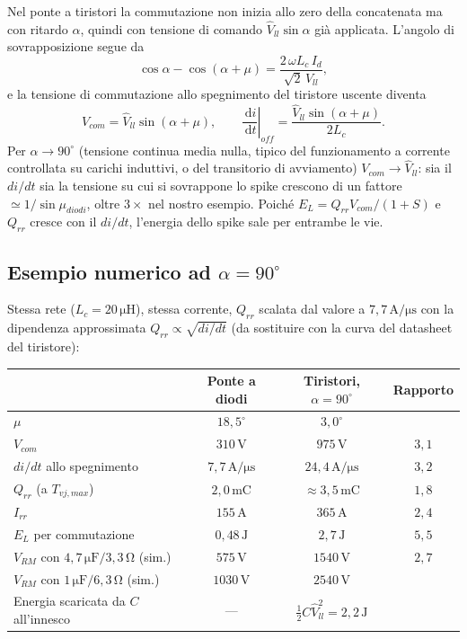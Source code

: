 \documentclass[11pt,a4paper]{article}
\newcommand{\ud}{\,\mathrm{d}}
\newcommand{\unit}[1]{\,\mathrm{#1}}
\begin{document}
Nel ponte a tiristori la commutazione non inizia allo zero della
concatenata ma con ritardo $\alpha$, quindi con tensione di comando
$\hat{V}_{ll}\sin\alpha$ gi\`a applicata. L'angolo di sovrapposizione
segue da
\begin{equation}
\cos\alpha - \cos(\alpha+\mu) = \frac{2\,\omega L_c\, I_d}{\sqrt{2}\,V_{ll}},
\end{equation}
e la tensione di commutazione allo spegnimento del tiristore uscente
diventa
\begin{equation}
V_{com} = \hat{V}_{ll}\sin(\alpha+\mu),
\qquad
\left.\frac{\ud i}{\ud t}\right|_{off} = \frac{\hat{V}_{ll}\sin(\alpha+\mu)}{2L_c}.
\end{equation}
Per $\alpha \to 90^\circ$ (tensione continua media nulla, tipico del
funzionamento a corrente controllata su carichi induttivi, o del
transitorio di avviamento) $V_{com}\to\hat{V}_{ll}$: sia il $di/dt$ sia
la tensione su cui si sovrappone lo spike crescono di un fattore
$\simeq 1/\sin\mu_{diodi}$, oltre $3\times$ nel nostro esempio. Poich\'e
$E_L = Q_{rr}V_{com}/(1+S)$ e $Q_{rr}$ cresce con il $di/dt$, l'energia
dello spike sale per entrambe le vie.

\subsection{Esempio numerico ad $\alpha = 90^\circ$}

Stessa rete ($L_c = 20\unit{\mu H}$), stessa corrente, $Q_{rr}$ scalata
dal valore a $7{,}7\unit{A/\mu s}$ con la dipendenza approssimata
$Q_{rr}\propto\sqrt{di/dt}$ (da sostituire con la curva del datasheet
del tiristore):

\begin{center}
\begin{tabular}{lccc}
\toprule
 & Ponte a diodi & Tiristori, $\alpha=90^\circ$ & Rapporto \\
\midrule
$\mu$ & $18{,}5^\circ$ & $3{,}0^\circ$ & \\
$V_{com}$ & $310\unit{V}$ & $975\unit{V}$ & $3{,}1$ \\
$di/dt$ allo spegnimento & $7{,}7\unit{A/\mu s}$ & $24{,}4\unit{A/\mu s}$ & $3{,}2$ \\
$Q_{rr}$ (a $T_{vj,max}$) & $2{,}0\unit{mC}$ & $\approx3{,}5\unit{mC}$ & $1{,}8$ \\
$I_{rr}$ & $155\unit{A}$ & $365\unit{A}$ & $2{,}4$ \\
$E_L$ per commutazione & $0{,}48\unit{J}$ & $2{,}7\unit{J}$ & $5{,}5$ \\
$V_{RM}$ con $4{,}7\unit{\mu F}/3{,}3\unit{\Omega}$ (sim.) & $575\unit{V}$ & $1540\unit{V}$ & $2{,}7$ \\
$V_{RM}$ con $1\unit{\mu F}/6{,}3\unit{\Omega}$ (sim.) & $1030\unit{V}$ & $2540\unit{V}$ & \\
Energia scaricata da $C$ all'innesco & --- & $\tfrac12 C\hat{V}_{ll}^2 = 2{,}2\unit{J}$ & \\
\bottomrule
\end{tabular}
\end{center}
\end{document}
